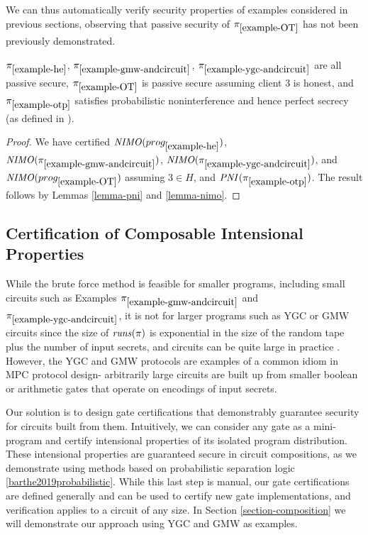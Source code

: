 We can thus automatically verify security properties of examples considered
in previous sections, observing that passive security of $\pi_{\ref{example-OT}}$
has not been previously demonstrated.
\begin{lemma}
  $\pi_{\ref{example-he}}$, $\pi_{\ref{example-gmw-andcircuit}}$,
  $\pi_{\ref{example-ygc-andcircuit}}$ are all passive secure,
  $\pi_{\ref{example-OT}}$ is passive secure assuming client 3 is
  honest, and $\pi_{\ref{example-otp}}$ satisfies probabilistic
  noninterference and hence perfect secrecy (as defined in
  \cite{barthe2019probabilistic}).
\end{lemma}
\begin{proof}
  We have certified $\mathit{NIMO}(prog_{\ref{example-he}})$, $\mathit{NIMO}(\pi_{\ref{example-gmw-andcircuit}})$,
  $\mathit{NIMO}(\pi_{\ref{example-ygc-andcircuit}})$, and $\mathit{NIMO}(prog_{\ref{example-OT}})$ assuming
  $3 \in H$, and $\mathit{PNI}(\pi_{\ref{example-otp}})$. The result follows by Lemmas
  \ref{lemma-pni} and \ref{lemma-nimo}.
\end{proof}

\subsection{Certification of Composable Intensional Properties}

While the brute force method is feasible for smaller programs,
including small circuits such as Examples
$\pi_{\ref{example-gmw-andcircuit}}$ and
$\pi_{\ref{example-ygc-andcircuit}}$, it is not for larger programs
such as YGC or GMW circuits since the size of $\mathit{runs}(\pi)$ is
exponential in the size of the random tape plus the number of input
secrets, and circuits can be quite large in practice
\cite{kreuter2012billion}.  However, the YGC and GMW protocols are
examples of a common idiom in MPC protocol design- arbitrarily large
circuits are built up from smaller boolean or arithmetic gates that
operate on encodings of input secrets.

Our solution is to design gate certifications that demonstrably
guarantee security for circuits built from them. Intuitively, we can
consider any gate as a mini-program and certify intensional properties
of its isolated program distribution. These intensional properties are
guaranteed secure in circuit compositions, as we demonstrate using
methods based on probabilistic separation logic
\ref{barthe2019probabilistic}. While this last step is manual, our
gate certifications are defined generally and can be used to certify
new gate implementations, and verification applies to a circuit of any
size. In Section \ref{section-composition} we will demonstrate our
approach using YGC and GMW as examples.

